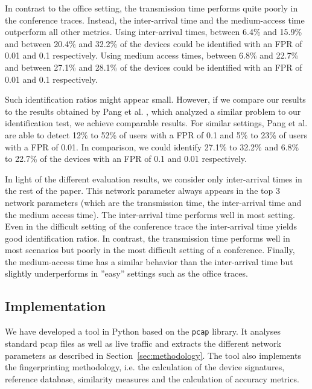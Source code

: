 \documentclass[10pt, conference, compsocconf, letterpaper]{IEEEtran}
\begin{document}
In contrast to the office setting, the transmission time performs quite poorly in the conference traces. Instead, the inter-arrival time and the medium-access time outperform all other metrics. Using inter-arrival times, between 6.4\% and 15.9\% and between 20.4\% and 32.2\% of the devices could be identified with an FPR of 0.01 and 0.1 respectively. Using medium access times, between 6.8\% and 22.7\% and between 27.1\% and 28.1\% of the devices could be identified with an FPR of 0.01 and 0.1 respectively.

Such identification ratios might appear small. However, if we compare our results to the results obtained by Pang et al. \cite{Pang:Mobicom}, which analyzed a similar problem to our identification test, we achieve comparable results. For similar settings,
Pang et al. are able to detect 12\% to 52\% of users with a FPR of 0.1 and 5\% to 23\% of users with a FPR of 0.01.
In comparison, we could identify  27.1\% to 32.2\% and 6.8\% to 22.7\% of the devices with an FPR of 0.1 and 0.01 respectively.





In light of the different evaluation results, we consider only inter-arrival times in the rest of the paper.
This network parameter always appears in the top 3 network parameters (which are the transmission time, the inter-arrival time and the medium access time).
The inter-arrival time performs well in most setting. Even in the difficult setting of the conference trace the inter-arrival time yields good identification ratios. In contrast, the transmission time performs well in most scenarios but poorly in the most difficult setting of a conference.
Finally, the medium-access time has a similar behavior than the inter-arrival time but slightly underperforms in ''easy'' settings such as the office traces.





\subsection{Implementation}
\label{ssec:implem}

We have developed a tool in Python based on the {\tt pcap} library. It analyses standard pcap files as well as live traffic and extracts the different network parameters as described in Section~\ref{sec:methodology}. The tool also implements the fingerprinting methodology, i.e. the calculation of the device signatures, reference database, similarity measures and the calculation of accuracy metrics.
\end{document}
